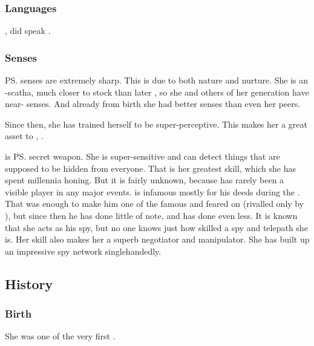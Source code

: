\subsubsection{Languages}
, \Criseis{} did speak \Velcadian. 





\subsubsection{Senses}
\ps{\Criseis} senses are extremely sharp. 
This is due to both nature and nurture. 
She is an \uber-scatha, much closer to \draconic{} stock than later \scathae, so she and others of her generation have near-\draconic{} senses. 
And already from birth she had better senses than even her peers. 

Since then, she has trained herself to be super-perceptive. 
This makes her a great asset to \Ishnaruchaefir, . 

\Criseis is \ps{\Ishnaruchaefir} secret weapon. 
She is super-sensitive and can detect things that are supposed to be hidden from everyone.
That is her greatest skill, which she has spent millennia honing.
But it is fairly unknown, because \Criseis has rarely been a visible player in any major events.
\Ishnaruchaefir is infamous mostly for his deeds during the \secondbanewar.
That was enough to make him one of the famous and feared \dragons on \Miith (rivalled only by \Secherdamon), but since then he has done little of note, and \Criseis has done even less.
It is known that she acts as his spy, but no one knows just how skilled a spy and telepath she is.
Her skill also makes her a superb negotiator and manipulator.
She has built up an impressive spy network singlehandedly.









\subsection{History}





\subsubsection{Birth}
She was one of the very first \scathae{}. 





